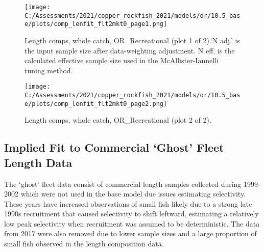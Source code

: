\documentclass[11pt,
  english,
  a4paper,
]{article}
\begin{document}
\tagmcend\tagstructend


\begin{figure}
\centering
\texttt{[image: C:/Assessments/2021/copper\_rockfish\_2021/models/or/10.5\_base/plots/comp\_lenfit\_flt2mkt0\_page1.png]}
\caption{Length comps, whole catch, OR\_Recreational (plot 1 of 2).`N adj.' is the input sample size after data-weighting adjustment. N eff. is the calculated effective sample size used in the McAllister-Iannelli tuning method.\label{fig:comp_lenfit_flt2mkt0_page1}}
\end{figure}

\tagmcend\tagstructend


\begin{figure}
\centering
\texttt{[image: C:/Assessments/2021/copper\_rockfish\_2021/models/or/10.5\_base/plots/comp\_lenfit\_flt2mkt0\_page2.png]}
\caption{Length comps, whole catch, OR\_Recreational (plot 2 of 2).\label{fig:comp_lenfit_flt2mkt0_page2}}
\end{figure}

\tagmcend\tagstructend

\clearpage


\hypertarget{append-com}{%
\subsection{Implied Fit to Commercial `Ghost' Fleet Length Data}\label{append-com}}

\leavevmode\tagmcend\tagstructend


The `ghost' fleet data consist of commercial length samples collected during 1999-2002 which were not used in the base model due issues estimating selectivity. These years have increased observations of small fish likely due to a strong late 1990s recruitment that caused selectivity to shift leftward, estimating a relatively low peak selectivity when recruitment was assumed to be deterministic. The data from 2017 were also removed due to lower sample sizes and a large proportion of small fish observed in the length composition data.

\leavevmode\tagmcend\tagstructend\par
\end{document}
